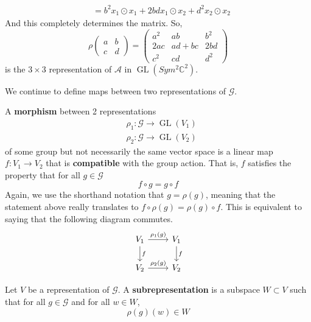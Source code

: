 \documentclass{article}
\DeclareMathOperator{\GL}{GL}
\begin{document}
\begin{example}
\begin{align*}
      & = b^2 x_1 \odot x_1 + 2bd x_1 \odot x_2 + d^2 x_2 \odot x_2
    \end{align*}
    And this completely determines the matrix. So, 
    \begin{equation}
      \rho \begin{pmatrix}
      a&b\\c&d
      \end{pmatrix} = \begin{pmatrix}
      a^2&ab&b^2\\2ac&ad+bc&2bd\\c^2&cd&d^2
      \end{pmatrix}
    \end{equation}
    is the $3 \times 3$ representation of $\mathcal{A}$ in $\GL(Sym^2 \mathbb{C}^2)$. 
  \end{example}

  We continue to define maps between two representations of $\mathcal{G}$. 

  \begin{definition}
    A \textbf{morphism} between 2 representations 
    \begin{align*}
      & \rho_1: \mathcal{G} \longrightarrow \GL(V_1) \\
      & \rho_2: \mathcal{G} \longrightarrow \GL(V_2) 
    \end{align*}
    of some group but not necessarily the same vector space is a linear map $f: V_1 \longrightarrow V_2$ that is \textbf{compatible} with the group action. That is, $f$ satisfies the property that for all $g \in \mathcal{G}$
    \begin{equation}
      f \circ g = g \circ f
    \end{equation}
    Again, we use the shorthand notation that $g = \rho(g)$, meaning that the statement above really translates to $ f \circ \rho(g) = \rho(g) \circ f$. This is equivalent to saying that the following diagram commutes. 
    \[\begin{tikzcd}
    V_1 \arrow{r}{\rho_1(g)} \arrow{d}{f} & V_1 \arrow{d}{f} \\
    V_2 \arrow{r}{\rho_2 (g)} & V_2
    \end{tikzcd}\]
  \end{definition}

  \begin{definition}
    Let $V$ be a representation of $\mathcal{G}$. A \textbf{subrepresentation} is a subspace $W \subset V$ such that for all $g \in \mathcal{G}$ and for all $w \in W$, 
    \begin{equation}
      \rho(g)(w) \in W
    \end{equation}
  \end{definition}
\end{document}
